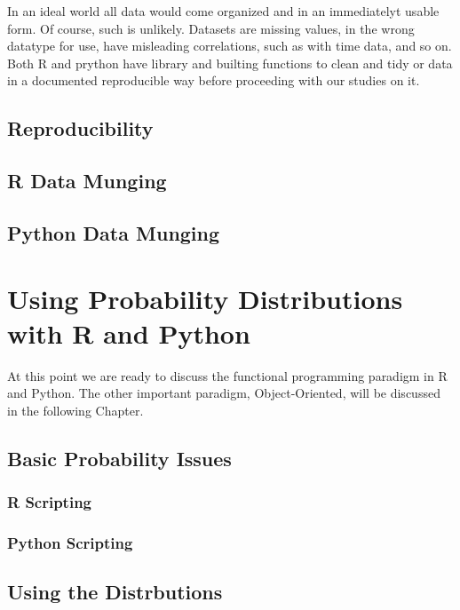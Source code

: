 \documentclass[]{book}
\theoremstyle{definition}
\theoremstyle{definition}
\theoremstyle{definition}
\theoremstyle{remark}
\begin{document}
In an ideal world all data would come organized and in an immediatelyt
usable form. Of course, such is unlikely. Datasets are missing values,
in the wrong datatype for use, have misleading correlations, such as
with time data, and so on. Both R and prython have library and builting
functions to clean and tidy or data in a documented reproducible way
before proceeding with our studies on it.

\section{Reproducibility}\label{reproducibility}

\section{R Data Munging}\label{r-data-munging}

\section{Python Data Munging}\label{python-data-munging}

\chapter{Using Probability Distributions with R and
Python}\label{using-probability-distributions-with-r-and-python}

At this point we are ready to discuss the functional programming
paradigm in R and Python. The other important paradigm, Object-Oriented,
will be discussed in the following Chapter.

\section{Basic Probability Issues}\label{basic-probability-issues}

\subsection{R Scripting}\label{r-scripting-5}

\subsection{Python Scripting}\label{python-scripting-5}

\section{Using the Distrbutions}\label{using-the-distrbutions}
\end{document}
